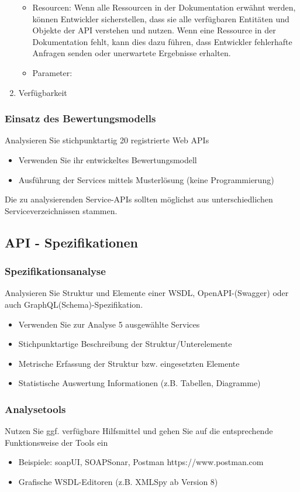 \documentclass[notitlepage, hidelinks]{article}
\begin{document}
\begin{enumerate}
\begin{itemize}
\item Resourcen: Wenn alle Ressourcen in der Dokumentation erwähnt werden, können Entwickler sicherstellen, dass sie alle verfügbaren Entitäten und Objekte der API verstehen und nutzen. Wenn eine Ressource in der Dokumentation fehlt, kann dies dazu führen, dass Entwickler fehlerhafte Anfragen senden oder unerwartete Ergebnisse erhalten.
\item Parameter: 
\end{itemize}
\item Verfügbarkeit
\end{enumerate}


\subsubsection{Einsatz des Bewertungsmodells}
Analysieren Sie stichpunktartig 20 registrierte Web APIs
\begin{itemize}
\item Verwenden Sie ihr entwickeltes Bewertungsmodell
\item Ausführung der Services mittels Musterlösung (keine Programmierung)
\end{itemize}
Die zu analysierenden Service-APIs sollten möglichst aus unterschiedlichen Serviceverzeichnissen stammen.

\subsection{API - Spezifikationen}
\subsubsection{Spezifikationsanalyse}
Analysieren Sie Struktur und Elemente einer WSDL, OpenAPI-(Swagger) oder auch GraphQL(Schema)-Spezifikation.
\begin{itemize}
\item Verwenden Sie zur Analyse 5 ausgewählte Services
\item Stichpunktartige Beschreibung der Struktur/Unterelemente
\item Metrische Erfassung der Struktur bzw. eingesetzten Elemente
\item Statistische Auswertung Informationen (z.B. Tabellen, Diagramme)
\end{itemize}

\subsubsection{Analysetools}
Nutzen Sie ggf. verfügbare Hilfsmittel und gehen Sie auf die entsprechende Funktionsweise der Tools ein
\begin{itemize}
\item Beispiele: soapUI, SOAPSonar, Postman https://www.postman.com
\item Grafische WSDL-Editoren (z.B. XMLSpy ab Version 8)
\end{itemize}
\end{document}
